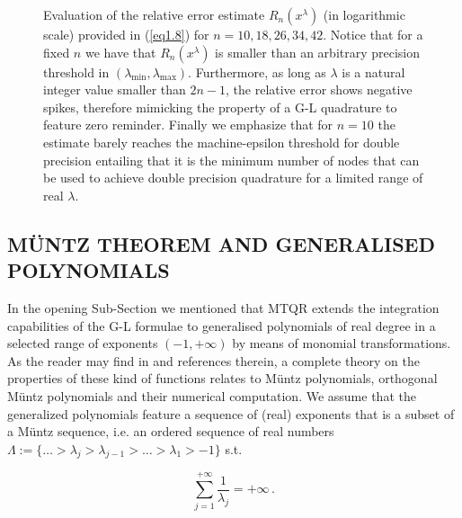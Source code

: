 \documentclass[a4paper, twosided]{book}
\begin{document}
\begin{center}
        \begin{figure}[H]
        \captionsetup{singlelinecheck=off}
        
        \caption{Evaluation of the relative error estimate $R_n(x^{\lambda})$ (in logarithmic scale) provided in (\ref{eq1.8}) for $n=10,18,26,34,42$. Notice that for a fixed $n$ we have that $R_n(x^{\lambda})$ is smaller than an arbitrary precision threshold in $(\lambda_{\text{min}},\lambda_{\text{max}})$. Furthermore, as long as $\lambda$ is a natural integer value smaller than $2n-1$, the relative error shows negative spikes, therefore mimicking the property of a G-L quadrature to feature zero reminder. Finally we emphasize that for $n=10$ the estimate barely reaches the machine-epsilon threshold for double precision entailing that it is the minimum number of nodes that can be used to achieve double precision quadrature for a limited range of real $\lambda$.}
        \label{Fig1.1}
        \end{figure}
\end{center}

\subsection[Müntz theorem and generalised polynomials]{\changefont MÜNTZ THEOREM AND GENERALISED POLYNOMIALS }\label{SubSec1.2.4}

In the opening Sub-Section we mentioned that MTQR extends the integration capabilities of the G-L formulae to generalised polynomials of real degree in a selected range of exponents $(-1,+\infty)$ by means of monomial transformations. As the reader may find in \cite{Lombardi09} and references therein, a complete theory on the properties of these kind of functions relates to Müntz polynomials, orthogonal Müntz polynomials and their numerical computation. 
\newline
We assume that the generalized polynomials feature a sequence of (real) exponents that is a subset of a Müntz sequence, i.e. an ordered sequence of real numbers $\Lambda:=\{\dots>\lambda_j>\lambda_{j-1}>\dots>\lambda_1>-1\}$ s.t.

\begin{equation}\label{eq1.10}
    \sum_{j=1}^{+\infty}\frac{1}{\lambda_j}=+\infty\,.
\end{equation}
\end{document}
